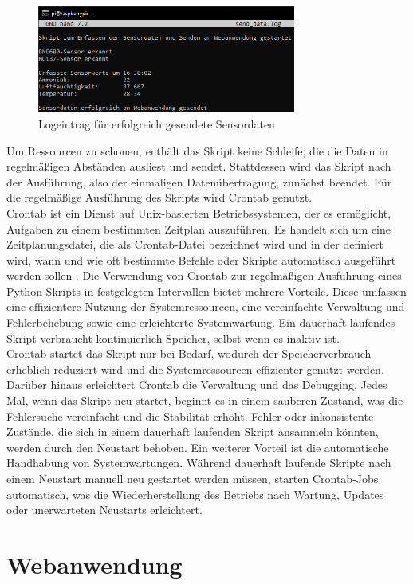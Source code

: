 \documentclass[conference]{IEEEtran}
\begin{document}
\begin{figure}[H]
	\centering
	\includegraphics[width=85mm]{fig/daten_erfolgreich_gesendet.png}
	\caption{Logeintrag für erfolgreich gesendete Sensordaten}
	\label{send_data_success}
\end{figure}
Um Ressourcen zu schonen, enthält das Skript keine Schleife, die die Daten in regelmäßigen Abständen ausliest und sendet. Stattdessen wird das Skript nach der Ausführung, also der einmaligen Datenübertragung, zunächst beendet. Für die regelmäßige Ausführung des Skripts wird Crontab genutzt. \\ 
Crontab ist ein Dienst auf Unix-basierten Betriebssystemen, der es ermöglicht, Aufgaben zu einem bestimmten Zeitplan auszuführen. Es handelt sich um eine Zeitplanungsdatei, die als Crontab-Datei bezeichnet wird und in der definiert wird, wann und wie oft bestimmte Befehle oder Skripte automatisch ausgeführt werden sollen \cite{crontab}. Die Verwendung von Crontab zur regelmäßigen Ausführung eines Python-Skripts in festgelegten Intervallen bietet mehrere Vorteile. Diese umfassen eine effizientere Nutzung der Systemressourcen, eine vereinfachte Verwaltung und Fehlerbehebung sowie eine erleichterte Systemwartung. Ein dauerhaft laufendes Skript verbraucht kontinuierlich Speicher, selbst wenn es inaktiv ist. \\
Crontab startet das Skript nur bei Bedarf, wodurch der Speicherverbrauch erheblich reduziert wird und die Systemressourcen effizienter genutzt werden. Darüber hinaus erleichtert Crontab die Verwaltung und das Debugging. Jedes Mal, wenn das Skript neu startet, beginnt es in einem sauberen Zustand, was die Fehlersuche vereinfacht und die Stabilität erhöht. Fehler oder inkonsistente Zustände, die sich in einem dauerhaft laufenden Skript ansammeln könnten, werden durch den Neustart behoben. Ein weiterer Vorteil ist die automatische Handhabung von Systemwartungen. Während dauerhaft laufende Skripte nach einem Neustart manuell neu gestartet werden müssen, starten Crontab-Jobs automatisch, was die Wiederherstellung des Betriebs nach Wartung, Updates oder unerwarteten Neustarts erleichtert.

\section{Webanwendung}
\end{document}
